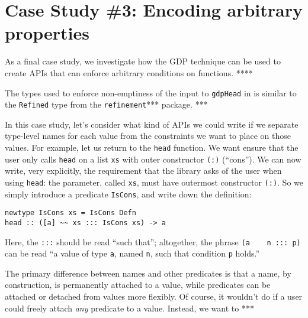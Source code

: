\documentclass[format=sigplan, review=false, screen=true]{acmart}
\begin{document}
\section{Case Study \#3: Encoding arbitrary properties}

As a final case study, we investigate how the GDP technique can be used to
create APIs that can enforce arbitrary conditions on functions. ****

The types used to enforce non-emptiness of the input to \texttt{gdpHead} in
 is similar to the \texttt{Refined} type from the \texttt{refinement}***
package. ***

In this case study, let's consider what kind of APIs we could write if we separate
type-level names for each value from the constraints we want to place on those values.
For example, let us return to the \texttt{head} function. We want ensure that the
user only calls \texttt{head} on a list \texttt{xs} with outer constructor \texttt{(:)} (``cons''). We can now write, very explicitly, the requirement that the library asks of the user
when using \texttt{head}: the parameter, called \texttt{xs}, must have outermost constructor
\texttt{(:)}. So we simply introduce a predicate \texttt{IsCons}, and write down the definition:
\begin{verbatim}
newtype IsCons xs = IsCons Defn
head :: ([a] ~~ xs ::: IsCons xs) -> a
\end{verbatim}
Here, the \texttt{:::} should be read ``such that''; altogether, the phrase 
\texttt{(a ~~ n ::: p)} can be read ``a value of type \texttt{a}, named \texttt{n}, such
that condition \texttt{p} holds.''

The primary difference between names and other predicates is that a name, by construction,
is permanently attached to a value, while predicates can be attached or detached from values
more flexibly. Of course, it wouldn't do if a user could freely attach \emph{any} predicate to a value. Instead, we want to ***
\end{document}

